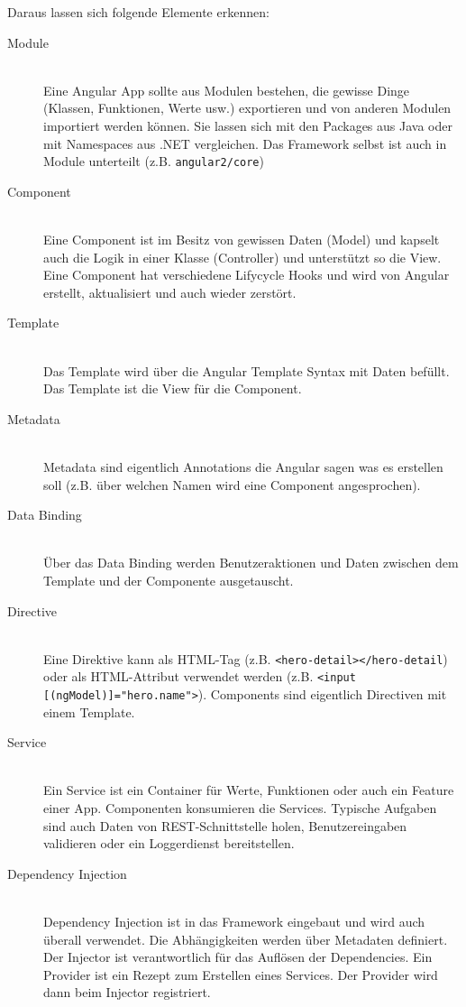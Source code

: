 Daraus lassen sich folgende Elemente erkennen:
\begin{description}
	\item[Module] \hfil \\
	Eine Angular App sollte aus Modulen bestehen, die gewisse Dinge (Klassen, Funktionen, Werte usw.) exportieren und von anderen Modulen importiert werden können. Sie lassen sich mit den Packages aus Java oder mit Namespaces aus .NET vergleichen. Das Framework selbst ist auch in Module unterteilt (z.B. \lstinline|angular2/core|)
	\item[Component] \hfil \\
	Eine Component ist im Besitz von gewissen Daten (Model) und kapselt auch die Logik in einer Klasse (Controller) und unterstützt so die View. Eine Component hat verschiedene Lifycycle Hooks und wird von Angular erstellt, aktualisiert und auch wieder zerstört.
	\item[Template] \hfil \\
	Das Template wird über die Angular Template Syntax mit Daten befüllt. Das Template ist die View für die Component.
	\item[Metadata] \hfil \\
	Metadata sind eigentlich Annotations die Angular sagen was es erstellen soll (z.B. über welchen Namen wird eine Component angesprochen).
	\item[Data Binding] \hfil \\
	Über das Data Binding werden Benutzeraktionen und Daten zwischen dem Template und der Componente ausgetauscht. 
	\item[Directive] \hfil \\
	Eine Direktive kann als HTML-Tag (z.B. \lstinline|<hero-detail></hero-detail|) oder als HTML-Attribut verwendet werden (z.B. \lstinline|<input [(ngModel)]="hero.name">|). Components sind eigentlich Directiven mit einem Template.
	\item[Service] \hfil \\
	Ein Service ist ein Container für Werte, Funktionen oder auch ein Feature einer App. Componenten konsumieren die Services. Typische Aufgaben sind auch Daten von REST-Schnittstelle holen, Benutzereingaben validieren oder ein Loggerdienst bereitstellen.
	\item[Dependency Injection] \hfil \\
	Dependency Injection ist in das Framework eingebaut und wird auch überall verwendet. Die Abhängigkeiten werden über Metadaten definiert. Der Injector ist verantwortlich für das Auflösen der Dependencies. Ein Provider ist ein Rezept zum Erstellen eines Services. Der Provider wird dann beim Injector registriert.
\end{description}
